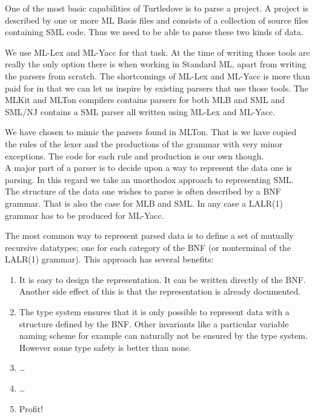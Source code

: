 One of the most basic capabilities of Turtledove is to parse a project. A
project is described by one or more ML Basis files and consists of a collection
of source files containing SML code. Thus we need to be able to parse these two
kinds of data.

We use ML-Lex and ML-Yacc for that task. At the time of writing those tools are
really the only option there is when working in Standard ML, apart from writing
the parsers from scratch. The shortcomings of ML-Lex and ML-Yacc is more than
paid for in that we can let us inspire by existing parsers that use those
tools. The MLKit and MLTon compilers contains parsers for both MLB and SML and
SML/NJ contains a SML parser all written using ML-Lex and ML-Yacc.

We have chosen to mimic the parsers found in MLTon. That is we have copied the
rules of the lexer and the productions of the grammar with very minor
exceptions. The code for each rule and production is our own though.
\\[1em]

A major part of a parser is to decide upon a way to represent the data one is
parsing. In this regard we take an unorthodox approach to representing SML.
\\[1em]

The structure of the data one wishes to parse is often described by a BNF
grammar. That is also the case for MLB and SML. In any case a LALR(1) grammar
has to be produced for ML-Yacc.

The most common way to represent parsed data is to define a set of mutually
recursive datatypes; one for each category of the BNF (or nonterminal of the
LALR(1) grammar). This approach has several benefits:

\begin{enumerate}
\item It is easy to design the representation. It can be written directly of the
      BNF. Another side effect of this is that the representation is already
      documented.
\item The type system ensures that it is only possible to represent data with a
      structure defined by the BNF. Other invariants like a particular variable
      naming scheme for example can naturally not be ensured by the type
      system. However some type safety is better than none.
\item \ldots
\item \ldots
\item Profit!
\end{enumerate}

